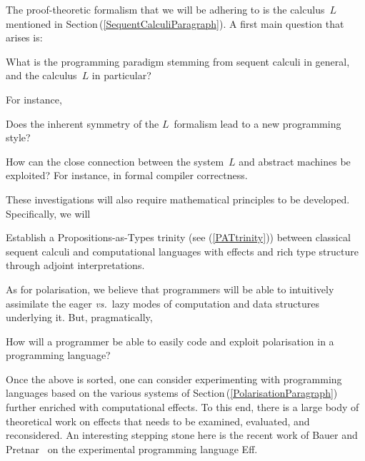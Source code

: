 \documentclass[11pt,twocolumn]{article}
\newcounter{CC}
\newenvironment{resenumerate}
  {\begin{list}{[\textbf{\arabic{CC}]}}
  {\usecounter{CC}
   \setlength{\topsep}{2pt}
   \setlength{\partopsep}{2pt}
   \setlength{\itemsep}{2.5pt}
   \setlength{\parsep}{2.5pt}
   \setlength{\leftmargin}{1.65em}
   \setlength{\labelwidth}{1.15em}
 }}
  {\end{list}}
\newcommand{\pref}[1]{\,(\ref{#1})}
\newcommand{\vs}{\emph{vs.}}
\newcommand{\SysL}{$L$}%
\begin{document}
The proof-theoretic formalism that we will be adhering to is the
calculus~{\SysL} mentioned in Section\pref{SequentCalculiParagraph}.  A first
main question that arises is:
\begin{resenumerate}\setcounter{CC}{0}
\item 
  What is the programming paradigm stemming from sequent calculi in
  general, and the calculus~{\SysL} in particular?
\end{resenumerate}
For instance, 
\begin{resenumerate}\setcounter{CC}{1}
\item
  Does the inherent symmetry of the {\SysL}~formalism lead to a new programming
  style?

\item
  How can the close connection between the system~{\SysL} and abstract
  machines be exploited?  For instance, in formal compiler correctness.
\end{resenumerate}
These investigations will also require mathematical principles to be
developed.  Specifically, we will 
\begin{resenumerate}\setcounter{CC}{3}
\item
  Establish a Propositions-as-Types 
  trinity (see (\ref{PATtrinity})) between classical sequent calculi and
  computational languages with effects and rich type structure through
  adjoint interpretations.
\end{resenumerate}

As for polarisation, we believe that programmers will be able to intuitively
assimilate the eager {\vs}~lazy modes of computation and data structures
underlying it.  But, pragmatically,
\begin{resenumerate}\setcounter{CC}{4}
\item
  How will a programmer be able to easily code and exploit polarisation in
  a programming language?
\end{resenumerate}

Once the above is sorted, one can consider experimenting with programming
languages based on the various systems of
Section\pref{PolarisationParagraph} further enriched with computational
effects.  To this end, there is a large body of theoretical work on
effects that needs to be examined, evaluated, and reconsidered.  An
interesting stepping stone here is the recent work of Bauer and
Pretnar~\cite{BauerPretnar} on the experimental programming language Eff.  
\end{document}
